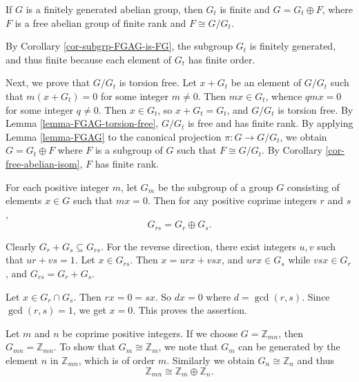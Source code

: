 \begin{theorem} \label{thm-FGAG-1}
	If $G$ is a finitely generated abelian group, then $G_t$ is finite and $G = G_t\oplus F$, where $F$ is a free abelian group of finite rank and $F\cong G/G_t$.
\end{theorem}
\begin{sketch}
By Corollary \ref{cor-subgrp-FGAG-is-FG}, the subgroup $G_t$ is  finitely generated,  and thus finite because each element of $G_t$ has finite order.
	
	Next, we prove that $G/G_{t}$ is torsion free. Let $x+G_t$ be an element of $G/G_{t}$ such that $m(x+G_t) = 0$ for some integer $m \neq 0$. Then $mx \in G_{t}$, whence $qmx = 0$ for some integer $q \neq 0$. Then $x \in G_{t}$, so $x+G_t = G_t$, and $G/G_{t}$ is torsion free. By Lemma \ref{lemma-FGAG-torsion-free}, $G/G_{t}$ is free and has finite rank. By applying   Lemma \ref{lemma-FGAG} to the canonical projection $\pi: G \rightarrow G/G_t$, we obtain
	$
		G = G_t \oplus F
	$
	where $F$ is a subgroup of $G$ such that $F\cong G/G_t$.  By Corollary \ref{cor-free-abelian-isom}, $F$ has finite rank.
\end{sketch}

\begin{lemma}\label{lemma-FGAG-coprime}
	For each positive integer $m$, let $G_m$ be  the subgroup of a group $G$ consisting of elements $x\in G$ such that $mx = 0$. Then for any positive coprime integers $r$ and $s$, 
	\begin{equation*}
		G_{rs} = G_r \oplus G_s.
	\end{equation*}
\end{lemma}
\begin{sketch}
	Clearly $G_r + G_s\subseteq G_{rs}$. For the reverse direction, there exist integers $u, v$ such that $ur + vs = 1$. Let $x\in G_{rs}$. Then $x = urx + vsx$, and $urx \in G_s$ while $vsx \in G_r$, and $G_{rs} = G_r + G_s$.
	
	Let $x\in G_r\cap G_s$. Then $rx = 0 =sx$. So $dx = 0$ where $d = \gcd(r,s)$. Since $\gcd(r,s) = 1$, we get $x = 0$. This proves the assertion.
\end{sketch}
\begin{remark}
	Let $m$ and $n$ be coprime positive integers. If we choose $G = \mathbb{Z}_{mn}$, then $G_{mn} = \mathbb{Z}_{mn}$. To show that $G_m \cong \mathbb{Z}_m$, we note that $G_m$ can be generated by the element $n$ in $\mathbb{Z}_{mn}$, which is of order $m$. Similarly we obtain $G_{n} \cong \mathbb{Z}_n$ and thus
	\begin{equation*}
		\mathbb{Z}_{mn} \cong \mathbb{Z}_{m} \oplus \mathbb{Z}_{n}.
	\end{equation*}
\end{remark}

